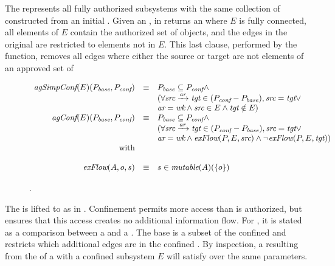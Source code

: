 The \term{\TMfullAuthAG} represents all fully authorized subsystems with the same collection of \TMobjs{} constructed from an initial \TMsystemState{}.
Given an \TMaccessGraph{}, \NMfullAuthAG{} in  returns an \TMaccessGraph{} where \(E\) is fully connected, all elements of \(E\) contain the authorized set of \TMalive{} objects, and the edges in the original \TMaccessGraph{} are restricted to elements not in \(E\).
This last clause, performed by the \NMrestrict{} function, removes all edges where either the source or target are not elements of an approved set of \TMrefs{}

\begin{figure}
  \[
  \begin{array}{rcl}
    \FNagSimplyConfined{E}{P_{\ident{base}}}{P_{\ident{conf}}} & \equiv & P_{\ident{base}} \subseteq P_{\ident{conf}} \wedge \\
    & & ( \forall \mkEdge{\ident{src}}{\ident{tgt}}{\ident{ar}} \in (P_{\ident{conf}} - P_{\ident{base}}), \ident{src} = \ident{tgt} \vee \\
    & & \ident{ar} = \NMwk \wedge \ident{src} \in E \wedge \ident{tgt} \notin E )\\
    \FNagConfined{E}{P_{\ident{base}}}{P_{\ident{conf}}} & \equiv & P_{\ident{base}} \subseteq P_{\ident{conf}} \wedge \\
    & & (\forall \mkEdge{\ident{src}}{\ident{tgt}}{ar} \in (P_{\ident{conf}} - P_{\ident{base}}), \ident{src} = \ident{tgt} \vee \\
    & & \ident{ar} = \NMwk \wedge \FNexFlow{P}{E}{\ident{src}} \wedge \neg \FNexFlow{P}{E}{\ident{tgt}})
    \\
    \text{with}\\
    \\
    \FNexFlow{A}{o}{s} & \equiv & s \in \FNmutableTwo{A}{\{o\}}
  \end{array}
  \]
\caption{\xmakefirstuc{\TMagConfined}. \label{fig:sketch:agConfined}}
\end{figure}

The \TMconfinementTest{} is lifted to \TMaccessGraphs{} as \NMagSimplyConfined{} in .
Confinement permits more access than is authorized, but ensures that this access creates no additional information flow.
For \TMaccessGraphs{}, it is stated as a comparison between a  \TMaccessGraph{} and a  \TMaccessGraph.
The base \TMaccessGraph{} is a subset of the confined \TMaccessGraph{} and restricts which additional edges are in the confined \TMaccessGraph{}.
By inspection, a \TMfullAuthAG{} resulting from the \TMdirAcc{} of a \TMsystemState{} with a confined subsystem \(E\) will satisfy \NMagSimplyConfined{} over the same parameters.

